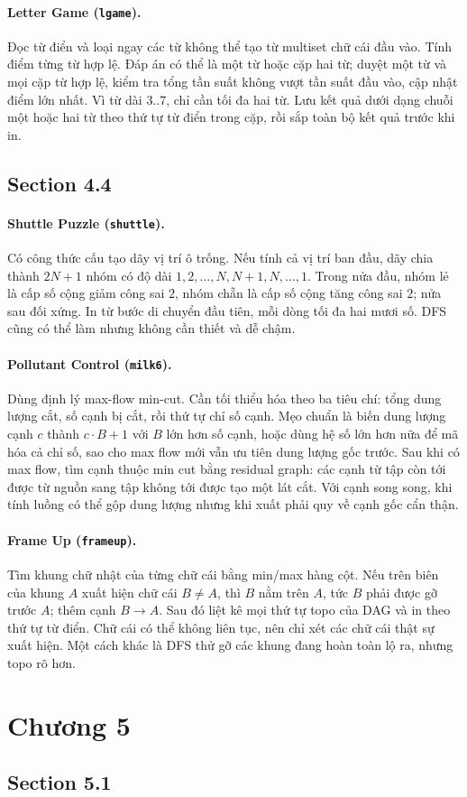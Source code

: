 \documentclass[11pt]{article}
\newcommand{\problem}[2]{\paragraph{#1 (\texttt{#2}).}}
\begin{document}
\problem{Letter Game}{lgame}
Đọc từ điển và loại ngay các từ không thể tạo từ multiset chữ cái đầu vào. Tính điểm từng từ hợp lệ. Đáp án có thể là một từ hoặc cặp hai từ; duyệt một từ và mọi cặp từ hợp lệ, kiểm tra tổng tần suất không vượt tần suất đầu vào, cập nhật điểm lớn nhất. Vì từ dài \(3..7\), chỉ cần tối đa hai từ. Lưu kết quả dưới dạng chuỗi một hoặc hai từ theo thứ tự từ điển trong cặp, rồi sắp toàn bộ kết quả trước khi in.

\subsection*{Section 4.4}

\problem{Shuttle Puzzle}{shuttle}
Có công thức cấu tạo dãy vị trí ô trống. Nếu tính cả vị trí ban đầu, dãy chia thành \(2N+1\) nhóm có độ dài \(1,2,\ldots,N,N+1,N,\ldots,1\). Trong nửa đầu, nhóm lẻ là cấp số cộng giảm công sai \(2\), nhóm chẵn là cấp số cộng tăng công sai \(2\); nửa sau đối xứng. In từ bước di chuyển đầu tiên, mỗi dòng tối đa hai mươi số. DFS cũng có thể làm nhưng không cần thiết và dễ chậm.

\problem{Pollutant Control}{milk6}
Dùng định lý max-flow min-cut. Cần tối thiểu hóa theo ba tiêu chí: tổng dung lượng cắt, số cạnh bị cắt, rồi thứ tự chỉ số cạnh. Mẹo chuẩn là biến dung lượng cạnh \(c\) thành \(c\cdot B + 1\) với \(B\) lớn hơn số cạnh, hoặc dùng hệ số lớn hơn nữa để mã hóa cả chỉ số, sao cho max flow mới vẫn ưu tiên dung lượng gốc trước. Sau khi có max flow, tìm cạnh thuộc min cut bằng residual graph: các cạnh từ tập còn tới được từ nguồn sang tập không tới được tạo một lát cắt. Với cạnh song song, khi tính luồng có thể gộp dung lượng nhưng khi xuất phải quy về cạnh gốc cẩn thận.

\problem{Frame Up}{frameup}
Tìm khung chữ nhật của từng chữ cái bằng min/max hàng cột. Nếu trên biên của khung \(A\) xuất hiện chữ cái \(B\ne A\), thì \(B\) nằm trên \(A\), tức \(B\) phải được gỡ trước \(A\); thêm cạnh \(B\to A\). Sau đó liệt kê mọi thứ tự topo của DAG và in theo thứ tự từ điển. Chữ cái có thể không liên tục, nên chỉ xét các chữ cái thật sự xuất hiện. Một cách khác là DFS thử gỡ các khung đang hoàn toàn lộ ra, nhưng topo rõ hơn.

\section*{Chương 5}

\subsection*{Section 5.1}
\end{document}
